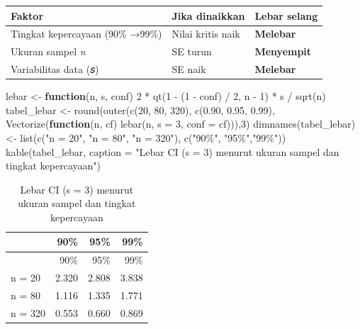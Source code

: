 \documentclass[
  indonesian,
  letterpaper,
]{book}
\newenvironment{Shaded}{\begin{snugshade}}{\end{snugshade}}
\newcommand{\AttributeTok}[1]{\textcolor[rgb]{0.40,0.45,0.13}{#1}}
\newcommand{\ControlFlowTok}[1]{\textcolor[rgb]{0.00,0.23,0.31}{\textbf{#1}}}
\newcommand{\DecValTok}[1]{\textcolor[rgb]{0.68,0.00,0.00}{#1}}
\newcommand{\FloatTok}[1]{\textcolor[rgb]{0.68,0.00,0.00}{#1}}
\newcommand{\FunctionTok}[1]{\textcolor[rgb]{0.28,0.35,0.67}{#1}}
\newcommand{\NormalTok}[1]{\textcolor[rgb]{0.00,0.23,0.31}{#1}}
\newcommand{\OtherTok}[1]{\textcolor[rgb]{0.00,0.23,0.31}{#1}}
\newcommand{\SpecialCharTok}[1]{\textcolor[rgb]{0.37,0.37,0.37}{#1}}
\newcommand{\StringTok}[1]{\textcolor[rgb]{0.13,0.47,0.30}{#1}}
\newcounter{none} %
\begin{document}
{\def\LTcaptype{none} %
\begin{longtable}[]{@{}lll@{}}
\toprule\noalign{}
Faktor & Jika dinaikkan & Lebar selang \\
\midrule\noalign{}
\endhead
\bottomrule\noalign{}
\endlastfoot
Tingkat kepercayaan (90\% →99\%) & Nilai kritis naik &
\textbf{Melebar} \\
Ukuran sampel \emph{n} & SE turun & \textbf{Menyempit} \\
Variabilitas data (𝑠) & SE naik & \textbf{Melebar} \\
\end{longtable}
}

\begin{Shaded}
\begin{Highlighting}[]
\NormalTok{lebar }\OtherTok{\textless{}{-}} \ControlFlowTok{function}\NormalTok{(n, s, conf) }\DecValTok{2} \SpecialCharTok{*} \FunctionTok{qt}\NormalTok{(}\DecValTok{1} \SpecialCharTok{{-}}\NormalTok{ (}\DecValTok{1} \SpecialCharTok{{-}}\NormalTok{ conf) }\SpecialCharTok{/} \DecValTok{2}\NormalTok{, n }\SpecialCharTok{{-}} \DecValTok{1}\NormalTok{) }\SpecialCharTok{*}\NormalTok{ s }\SpecialCharTok{/} \FunctionTok{sqrt}\NormalTok{(n)}
\NormalTok{tabel\_lebar }\OtherTok{\textless{}{-}} \FunctionTok{round}\NormalTok{(}\FunctionTok{outer}\NormalTok{(}\FunctionTok{c}\NormalTok{(}\DecValTok{20}\NormalTok{, }\DecValTok{80}\NormalTok{, }\DecValTok{320}\NormalTok{), }\FunctionTok{c}\NormalTok{(}\FloatTok{0.90}\NormalTok{, }\FloatTok{0.95}\NormalTok{, }\FloatTok{0.99}\NormalTok{),}
\FunctionTok{Vectorize}\NormalTok{(}\ControlFlowTok{function}\NormalTok{(n, cf) }\FunctionTok{lebar}\NormalTok{(n, }\AttributeTok{s =} \DecValTok{3}\NormalTok{, }\AttributeTok{conf =}\NormalTok{ cf))),}\DecValTok{3}\NormalTok{)}
\FunctionTok{dimnames}\NormalTok{(tabel\_lebar) }\OtherTok{\textless{}{-}} \FunctionTok{list}\NormalTok{(}\FunctionTok{c}\NormalTok{(}\StringTok{"n = 20"}\NormalTok{, }\StringTok{"n = 80"}\NormalTok{, }\StringTok{"n = 320"}\NormalTok{), }\FunctionTok{c}\NormalTok{(}\StringTok{"90\%"}\NormalTok{, }\StringTok{"95\%"}\NormalTok{,}\StringTok{"99\%"}\NormalTok{))}
\FunctionTok{kable}\NormalTok{(tabel\_lebar, }\AttributeTok{caption =} \StringTok{"Lebar CI (s = 3) menurut ukuran sampel dan tingkat kepercayaan"}\NormalTok{)}
\end{Highlighting}
\end{Shaded}

\begin{longtable}[]{@{}lrrr@{}}
\caption{Lebar CI (s = 3) menurut ukuran sampel dan tingkat
kepercayaan}\tabularnewline
\toprule\noalign{}
& 90\% & 95\% & 99\% \\
\midrule\noalign{}
\endfirsthead
\toprule\noalign{}
& 90\% & 95\% & 99\% \\
\midrule\noalign{}
\endhead
\bottomrule\noalign{}
\endlastfoot
n = 20 & 2.320 & 2.808 & 3.838 \\
n = 80 & 1.116 & 1.335 & 1.771 \\
n = 320 & 0.553 & 0.660 & 0.869 \\
\end{longtable}
\end{document}
